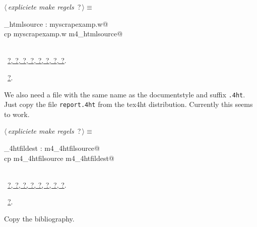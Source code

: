 \documentclass[twoside]{artikel3}
\renewcommand{\NWlink}[2]{\hyperlink{#1}{#2}}
\renewcommand{\NWtarget}[2]{\hypertarget{#1}{#2}}
\renewcommand{\NWsep}{$\diamond$\rule[-1\baselineskip]{0pt}{1\baselineskip}}
\renewcommand{\NWlink}[2]{\hyperlink{#1}{#2}}
\renewcommand{\NWtarget}[2]{\hypertarget{#1}{#2}}
\begin{document}
\begin{flushleft} \small
\begin{minipage}{\linewidth}\label{scrap31}\raggedright\small
\NWtarget{nuweb?}{} $\langle\,${\itshape expliciete make regels}\nobreak\ {\footnotesize {?}}$\,\rangle\equiv$
\vspace{-1ex}
\begin{list}{}{} \item
\mbox{}_htmlsource : myscrapexamp.w@\\
\mbox{}\verb@        cp  myscrapexamp.w m4_htmlsource@\\
\mbox{}\verb@@\\
\mbox{}\verb@@{\NWsep}
\end{list}
\vspace{-1.5ex}
\footnotesize
\begin{list}{}{\setlength{\itemsep}{-\parsep}\setlength{\itemindent}{-\leftmargin}}
\item \NWtxtMacroDefBy\ \NWlink{nuweb?}{?}\NWlink{nuweb?}{, ?}\NWlink{nuweb?}{, ?}\NWlink{nuweb?}{, ?}\NWlink{nuweb?}{, ?}\NWlink{nuweb?}{, ?}\NWlink{nuweb?}{, ?}\NWlink{nuweb?}{, ?}.
\item \NWtxtMacroRefIn\ \NWlink{nuweb?}{?}.

\item{}
\end{list}
\end{minipage}\vspace{4ex}
\end{flushleft}
We also need a file with the same name as the documentstyle and suffix
\verb|.4ht|. Just copy the file \verb|report.4ht| from the tex4ht
distribution. Currently this seems to work.

\begin{flushleft} \small
\begin{minipage}{\linewidth}\label{scrap32}\raggedright\small
\NWtarget{nuweb?}{} $\langle\,${\itshape expliciete make regels}\nobreak\ {\footnotesize {?}}$\,\rangle\equiv$
\vspace{-1ex}
\begin{list}{}{} \item
\mbox{}_4htfildest : m4_4htfilsource@\\
\mbox{}\verb@        cp m4_4htfilsource m4_4htfildest@\\
\mbox{}\verb@@\\
\mbox{}\verb@@{\NWsep}
\end{list}
\vspace{-1.5ex}
\footnotesize
\begin{list}{}{\setlength{\itemsep}{-\parsep}\setlength{\itemindent}{-\leftmargin}}
\item \NWtxtMacroDefBy\ \NWlink{nuweb?}{?}\NWlink{nuweb?}{, ?}\NWlink{nuweb?}{, ?}\NWlink{nuweb?}{, ?}\NWlink{nuweb?}{, ?}\NWlink{nuweb?}{, ?}\NWlink{nuweb?}{, ?}\NWlink{nuweb?}{, ?}.
\item \NWtxtMacroRefIn\ \NWlink{nuweb?}{?}.

\item{}
\end{list}
\end{minipage}\vspace{4ex}
\end{flushleft}
Copy the bibliography.
\end{document}
